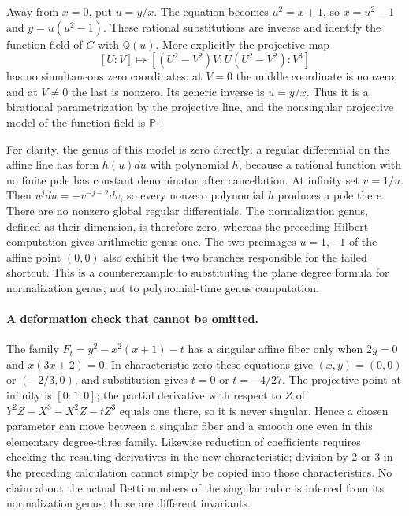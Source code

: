 \documentclass[11pt]{article}
\begin{document}
Away from $x=0$, put $u=y/x$. The equation becomes
$u^2=x+1$, so $x=u^2-1$ and $y=u(u^2-1)$.
These rational substitutions are inverse and identify the function
field of $C$ with $\mathbb Q(u)$. More explicitly the projective map
\[
[U:V]\longmapsto[(U^2-V^2)V:U(U^2-V^2):V^3]
\]
has no simultaneous zero coordinates: at $V=0$ the middle coordinate
is nonzero, and at $V\ne0$ the last is nonzero. Its generic inverse
is $u=y/x$. Thus it is a birational parametrization by the projective
line, and the nonsingular projective model of the function field is
$\mathbb P^1$.

For clarity, the genus of this model is zero directly: a regular
differential on the affine line has form $h(u)du$ with polynomial
$h$, because a rational function with no finite pole has constant
denominator after cancellation. At infinity set $v=1/u$. Then
$u^jdu=-v^{-j-2}dv$, so every nonzero polynomial $h$ produces a
pole there. There are no nonzero global regular differentials.
The normalization genus, defined as their dimension, is therefore
zero, whereas the preceding Hilbert computation gives arithmetic
genus one. The two preimages $u=1,-1$ of the affine point $(0,0)$
also exhibit the two branches responsible for the failed shortcut.
This is a counterexample to substituting the plane degree formula
for normalization genus, not to polynomial-time genus computation.

\paragraph{A deformation check that cannot be omitted.}
The family
$F_t=y^2-x^2(x+1)-t$ has a singular affine fiber only when
$2y=0$ and $x(3x+2)=0$. In characteristic zero these equations
give $(x,y)=(0,0)$ or $(-2/3,0)$, and substitution gives
$t=0$ or $t=-4/27$. The projective point at infinity is
$[0:1:0]$; the partial derivative with respect to $Z$ of
$Y^2Z-X^3-X^2Z-tZ^3$ equals one there, so it is never singular.
Hence a chosen parameter can move between a singular fiber and a
smooth one even in this elementary degree-three family. Likewise
reduction of coefficients requires checking the resulting derivatives
in the new characteristic; division by 2 or 3 in the preceding
calculation cannot simply be copied into those characteristics.
No claim about the actual Betti numbers of the singular cubic is
inferred from its normalization genus: those are different invariants.
\end{document}
